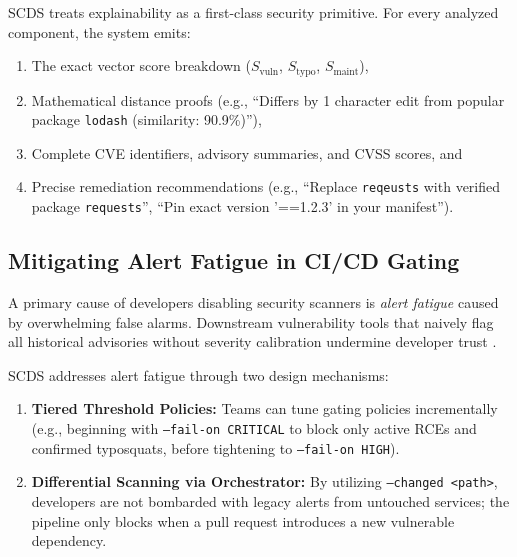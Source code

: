 SCDS treats explainability as a first-class security primitive. For every analyzed component, the system emits:
\begin{enumerate}
    \item The exact vector score breakdown ($S_{\text{vuln}}$, $S_{\text{typo}}$, $S_{\text{maint}}$),
    \item Mathematical distance proofs (e.g., ``Differs by 1 character edit from popular package \texttt{lodash} (similarity: 90.9\%)''),
    \item Complete CVE identifiers, advisory summaries, and CVSS scores, and
    \item Precise remediation recommendations (e.g., ``Replace \texttt{reqeusts} with verified package \texttt{requests}'', ``Pin exact version '==1.2.3' in your manifest'').
\end{enumerate}

\subsection{Mitigating Alert Fatigue in CI/CD Gating}
A primary cause of developers disabling security scanners is \textit{alert fatigue} caused by overwhelming false alarms. Downstream vulnerability tools that naively flag all historical advisories without severity calibration undermine developer trust \cite{jiang2025sbom}.

SCDS addresses alert fatigue through two design mechanisms:
\begin{enumerate}
    \item \textbf{Tiered Threshold Policies:} Teams can tune gating policies incrementally (e.g., beginning with \texttt{--fail-on CRITICAL} to block only active RCEs and confirmed typosquats, before tightening to \texttt{--fail-on HIGH}).
    \item \textbf{Differential Scanning via Orchestrator:} By utilizing \texttt{--changed <path>}, developers are not bombarded with legacy alerts from untouched services; the pipeline only blocks when a pull request introduces a new vulnerable dependency.
\end{enumerate}
